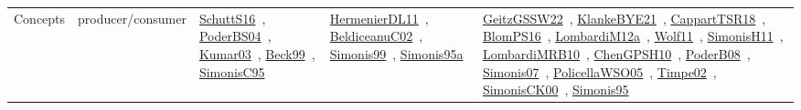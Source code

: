{\begin{longtable}{lp{3cm}>{\raggedright\arraybackslash}p{6cm}>{\raggedright\arraybackslash}p{6cm}>{\raggedright\arraybackslash}p{8cm}}
Concepts & producer/consumer & \href{../works/SchuttS16.pdf}{SchuttS16}~\cite{SchuttS16}, \href{../works/PoderBS04.pdf}{PoderBS04}~\cite{PoderBS04}, \href{../works/Kumar03.pdf}{Kumar03}~\cite{Kumar03}, \href{../works/Beck99.pdf}{Beck99}~\cite{Beck99}, \href{../works/SimonisC95.pdf}{SimonisC95}~\cite{SimonisC95} & \href{../works/HermenierDL11.pdf}{HermenierDL11}~\cite{HermenierDL11}, \href{../works/BeldiceanuC02.pdf}{BeldiceanuC02}~\cite{BeldiceanuC02}, \href{../works/Simonis99.pdf}{Simonis99}~\cite{Simonis99}, \href{../works/Simonis95a.pdf}{Simonis95a}~\cite{Simonis95a} & \href{../works/GeitzGSSW22.pdf}{GeitzGSSW22}~\cite{GeitzGSSW22}, \href{../works/KlankeBYE21.pdf}{KlankeBYE21}~\cite{KlankeBYE21}, \href{../works/CappartTSR18.pdf}{CappartTSR18}~\cite{CappartTSR18}, \href{../works/BlomPS16.pdf}{BlomPS16}~\cite{BlomPS16}, \href{../works/LombardiM12a.pdf}{LombardiM12a}~\cite{LombardiM12a}, \href{../works/Wolf11.pdf}{Wolf11}~\cite{Wolf11}, \href{../works/SimonisH11.pdf}{SimonisH11}~\cite{SimonisH11}, \href{../works/LombardiMRB10.pdf}{LombardiMRB10}~\cite{LombardiMRB10}, \href{../works/ChenGPSH10.pdf}{ChenGPSH10}~\cite{ChenGPSH10}, \href{../works/PoderB08.pdf}{PoderB08}~\cite{PoderB08}, \href{../works/Simonis07.pdf}{Simonis07}~\cite{Simonis07}, \href{../works/PolicellaWSO05.pdf}{PolicellaWSO05}~\cite{PolicellaWSO05}, \href{../works/Timpe02.pdf}{Timpe02}~\cite{Timpe02}, \href{../works/SimonisCK00.pdf}{SimonisCK00}~\cite{SimonisCK00}, \href{../works/Simonis95.pdf}{Simonis95}~\cite{Simonis95}\\

\end{longtable}}
